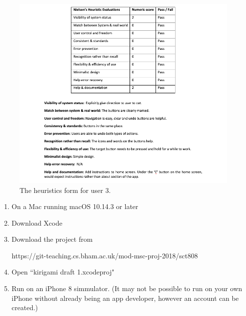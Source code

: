\documentclass[11pt]{article}
\begin{document}
    \begin{figure}[!ht]
            \centering
            \includegraphics[width=1\linewidth]{Images/User3.png}
            \caption{The heuristics form for user 3.}
            \label{fig:user3}
    \end{figure}

\clearpage
{}

        \begin{enumerate}
            \item On a Mac running macOS 10.14.3 or later
            \item Download Xcode
            \item Download the project from 
            
            https://git-teaching.cs.bham.ac.uk/mod-msc-proj-2018/sct808
            \item Open ``kirigami draft 1.xcodeproj"
            \item Run on an iPhone 8 simmulator. 
            (It may not be possible to run on your own iPhone without already being an app developer, however an account can be created.)
      
        \end{enumerate}
\end{document}
